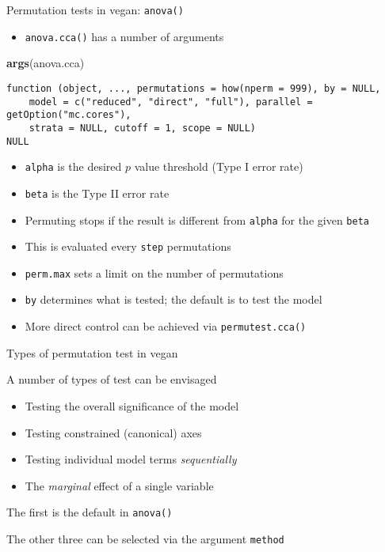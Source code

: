 \documentclass[10pt,ignorenonframetext,compress, aspectratio=169]{beamer}
\newenvironment{Shaded}{\begin{snugshade}}{\end{snugshade}}
\newcommand{\KeywordTok}[1]{\textcolor[rgb]{0.13,0.29,0.53}{\textbf{{#1}}}}
\newcommand{\NormalTok}[1]{{#1}}
\begin{document}
\begin{frame}[fragile]{Permutation tests in vegan: \texttt{anova()}}

\begin{itemize}
\itemsep1pt\parskip0pt
\item
  \texttt{anova.cca()} has a number of arguments
\end{itemize}

\tiny

\begin{Shaded}
\begin{Highlighting}[]
\KeywordTok{args}\NormalTok{(anova.cca)}
\end{Highlighting}
\end{Shaded}

\begin{verbatim}
function (object, ..., permutations = how(nperm = 999), by = NULL, 
    model = c("reduced", "direct", "full"), parallel = getOption("mc.cores"), 
    strata = NULL, cutoff = 1, scope = NULL) 
NULL
\end{verbatim}

\normalsize

\begin{itemize}
\itemsep1pt\parskip0pt
\item
  \texttt{alpha} is the desired \(p\) value threshold (Type I error
  rate)
\item
  \texttt{beta} is the Type II error rate
\item
  Permuting stops if the result is different from \texttt{alpha} for the
  given \texttt{beta}
\item
  This is evaluated every \texttt{step} permutations
\item
  \texttt{perm.max} sets a limit on the number of permutations
\item
  \texttt{by} determines what is tested; the default is to test the
  model
\item
  More direct control can be achieved via \texttt{permutest.cca()}
\end{itemize}

\end{frame}

\begin{frame}{Types of permutation test in vegan}

A number of types of test can be envisaged

\begin{itemize}
\itemsep1pt\parskip0pt
\item
  Testing the overall significance of the model
\item
  Testing constrained (canonical) axes
\item
  Testing individual model terms \emph{sequentially}
\item
  The \emph{marginal} effect of a single variable
\end{itemize}

The first is the default in \texttt{anova()}

The other three can be selected via the argument \texttt{method}

\end{frame}
\end{document}
